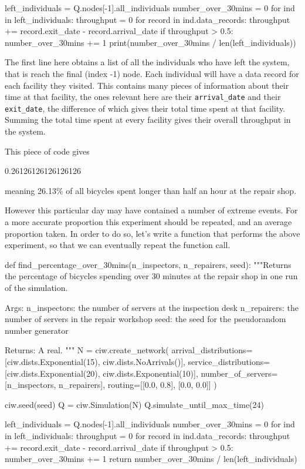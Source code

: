 \begin{pyin}
left_individuals = Q.nodes[-1].all_individuals
number_over_30mins = 0
for ind in left_individuals:
    throughput = 0
    for record in ind.data_records:
        throughput += record.exit_date - record.arrival_date
    if throughput > 0.5:
        number_over_30mins += 1
print(number_over_30mins / len(left_individuals))
\end{pyin}

The first line here obtains a list of all the individuals who have left the
system, that is reach the final (index -1) node.
Each individual will have a data record for each facility they visited. This
contains many pieces of information about their time at that facility, the ones
relevant here are their \texttt{arrival_date} and their
\texttt{exit_date}, the difference of which gives their total time
spent at that facility. Summing the total time spent at every facility gives
their overall throughput in the system.

This piece of code gives

\begin{pyout}
0.26126126126126126
\end{pyout}

meaning 26.13\% of all bicycles spent longer than half an hour at the repair
shop.

However this particular day may have contained a number of extreme events.
For a more accurate proportion this experiment should be repeated, and an
average proportion taken.
In order to do so, let's write a function that performs the above experiment, so
that we can eventually repeat the function call.

\begin{pyin}
def find_percentage_over_30mins(n_inspectors, n_repairers, seed):
    """Returns the percentage of bicycles spending over 30 minutes
    at the repair shop in one run of the simulation.
    
    Args:
        n_inspectors: the number of servers at the inspection desk
        n_repairers: the number of servers in the repair workshop
        seed: the seed for the pseudorandom number generator

    Returns:
        A real.
    """
    N = ciw.create_network(
        arrival_distributions=[ciw.dists.Exponential(15), ciw.dists.NoArrivals()],
        service_distributions=[ciw.dists.Exponential(20), ciw.dists.Exponential(10)],
        number_of_servers=[n_inspectors, n_repairers],
        routing=[[0.0, 0.8], [0.0, 0.0]]
    )

    ciw.seed(seed)
    Q = ciw.Simulation(N)
    Q.simulate_until_max_time(24)

    left_individuals = Q.nodes[-1].all_individuals
    number_over_30mins = 0
    for ind in left_individuals:
        throughput = 0
        for record in ind.data_records:
            throughput += record.exit_date - record.arrival_date
        if throughput > 0.5:
            number_over_30mins += 1
    return number_over_30mins / len(left_individuals)
\end{pyin}


